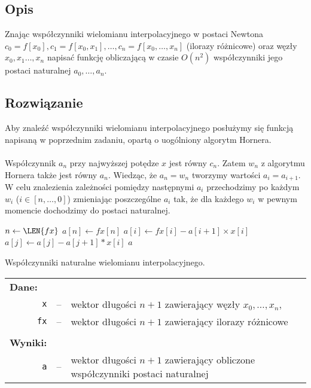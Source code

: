 \documentclass[10pt,a4paper, polish]{article}
\begin{document}
\subsection*{Opis}
Znając współczynniki wielomianu interpolacyjnego w postaci Newtona $c_0 = f[x_0], c_1 = f[x_0,x_1], \ldots, c_n = f[x_0, \ldots, x_n]$ (ilorazy różnicowe) oraz węzły $x_0, x_1 \ldots, x_n$ napisać funkcję obliczającą w czasie $O(n^2)$ współczynniki jego postaci naturalnej  $a_0,\ldots,a_n$.

\subsection*{Rozwiązanie}

Aby znaleźć współczynniki wielomianu interpolacyjnego posłużymy się funkcją napisaną w poprzednim zadaniu, opartą o uogólniony algorytm Hornera.\\\\
Współczynnik $a_n$ przy najwyższej potędze $x$ jest równy $c_n$. Zatem $w_n$ z algorytmu Hornera także jest równy $a_n$. Wiedząc, że $a_n = w_n$ tworzymy wartości $a_i = a_{i+1}$. W celu znalezienia zależności pomiędzy następnymi $a_i$ przechodzimy po każdym $w_i$ ($i \in [n,\ldots,0]$) zmieniając poszczególne $a_i$ tak, że dla każdego $w_i$ w pewnym momencie dochodzimy do postaci naturalnej.

		\begin{algorithm}[h]
			\DontPrintSemicolon
		    	 {
		    		$n \gets \LEN{fx}$\;
		    		$a[n] \gets fx[n]$\;
		    		 {
		    			$a[i] \gets fx[i] - a[i+1] \times x[i]$\; 
		    			 {
		    				$a[j] \gets a[j] - a[j+1] * x[i]$\; 	
					}	
		    		}
		    		\KwRet $a$\;
    			}

    			\caption{Współczynniki naturalne wielomianu interpolacyjnego.}
    			\label{alg:zad3}
		\end{algorithm}	
\begin{longtable}[l]{r  c  l}
\multicolumn{1}{l}{\textbf{Dane:}}&& \\
\texttt{x}&--&wektor długości $n+1$ zawierający węzły $x_0, \ldots, x_n$, \\
\texttt{fx}&--&wektor długości $n+1$ zawierający ilorazy różnicowe \\
&& \\
\multicolumn{1}{l}{\textbf{Wyniki:}}&& \\
\texttt{a}&--&wektor długości $n+1$ zawierający obliczone współczynniki postaci naturalnej \\
\end{longtable}
\end{document}

